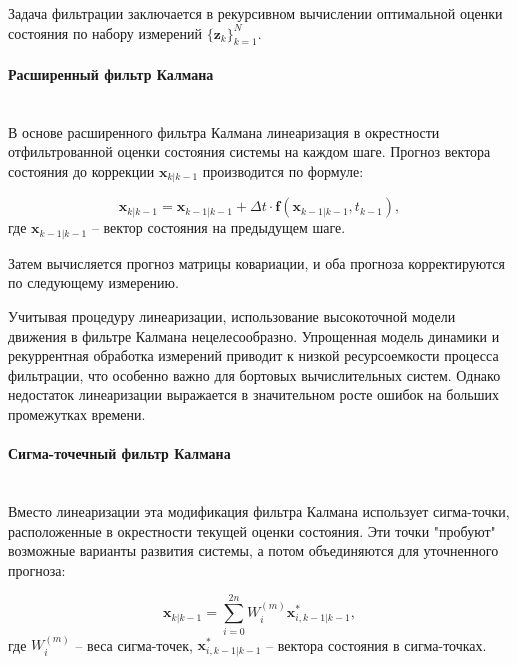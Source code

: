 Задача фильтрации заключается в рекурсивном вычислении оптимальной оценки состояния
по набору измерений $\{\mathbf{z}_k\}_{k=1}^N$. 

\paragraph{Расширенный фильтр Калмана} \mbox{} \\

В основе расширенного фильтра Калмана линеаризация в окрестности отфильтрованной
оценки состояния системы на каждом шаге. Прогноз вектора состояния до коррекции $\mathbf{x}_{k|k-1}$
производится по формуле:

\begin{equation*}
    \mathbf{x}_{k|k-1} = \mathbf{x}_{k-1|k-1} 
    + \Delta t \cdot \mathbf{f} (\mathbf{x}_{k-1|k-1}, t_{k-1}),
\end{equation*}
где $\mathbf{x}_{k-1|k-1}$ -- вектор состояния на предыдущем шаге.

Затем вычисляется прогноз матрицы ковариации, и оба прогноза корректируются по 
следующему измерению.

Учитывая процедуру линеаризации, использование высокоточной модели движения в
фильтре Калмана нецелесообразно. Упрощенная модель динамики и рекуррентная обработка
измерений приводит к низкой ресурсоемкости процесса фильтрации, что особенно важно
для бортовых вычислительных систем. Однако недостаток линеаризации выражается в значительном
росте ошибок на больших промежутках времени.

\paragraph{Сигма-точечный фильтр Калмана} \mbox{} \\

Вместо линеаризации эта модификация фильтра Калмана использует сигма-точки,
расположенные в окрестности текущей оценки состояния. Эти точки "пробуют" возможные
варианты развития системы, а потом объединяются для уточненного прогноза:

\begin{equation*}
    \mathbf{x}_{k|k-1} = \sum_{i = 0}^{2n} W_i^{(m)} \mathbf{x}^{*}_{i, k-1|k-1},
\end{equation*}
где $W_i^{(m)}$ -- веса сигма-точек, $\mathbf{x}^{*}_{i, k-1|k-1}$ -- вектора состояния в сигма-точках.